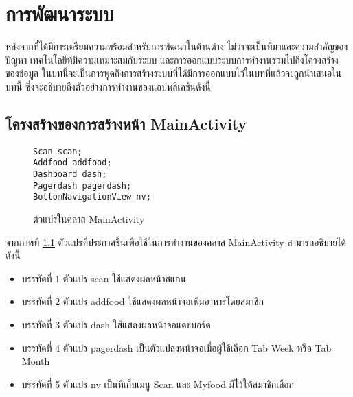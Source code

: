 \chapter{การพัฒนาระบบ}
หลังจากที่ได้มีการเตรียมความพร้อมสำหรับการพัฒนาในด้านต่าง ไม่ว่าจะเป็นที่มาและความสำคัญของปัญหา เทคโนโลยีที่มีความเหมาะสมกับระบบ และการออกแบบระบบการทำงานรวมไปถึงโครงสร้างของข้อมูล ในบทนี้จะเป็นการพูดถึงการสร้างระบบที่ได้มีการออกแบบไว้ในบทที่แล้วจะถูกนำเสนอในบทนี้ ซึ่งจะอธิบายถึงตัวอย่างการทำงานของแอปพลิเคชันดังนี้
		\section{โครงสร้างของการสร้างหน้า MainActivity}
		\begin{figure}[H]
			{\begin{lstlisting}
Scan scan;
Addfood addfood;
Dashboard dash;
Pagerdash pagerdash;
BottomNavigationView nv;
				\end{lstlisting}}
			\caption{ตัวแปรในคลาส MainActivity}
			\label{Fig:MainActivity}
		\end{figure}
		จากภาพที่ \ref{Fig:MainActivity} ตัวแปรที่ประกาศขึ้นเพื่อใช้ในการทำงานของคลาส MainActivity สามารถอธิบายได้ดังนี้
		\begin{itemize}[label={--}]
			\item บรรทัดที่ 1 ตัวแปร scan ใช้แสดงผลหน้าสแกน
			\item บรรทัดที่ 2 ตัวแปร addfood ใช้แสดงผลหน้าจอเพิ่มอาหารโดยสมาชิก  
			\item บรรทัดที่ 3 ตัวแปร dash ใส้แสดงผลหน้าจอแดชบอร์ด
			\item บรรทัดที่ 4 ตัวแปร pagerdash เป็นตัวแปลงหน้าจอเมื่อผู้ใช้เลือก Tab Week หรือ Tab Month
			\item บรรทัดที่ 5 ตัวแปร nv เป็นที่เก็บเมนู Scan และ Myfood มีไว้ให้สมาชิกเลือก
		
		\end{itemize}

		


